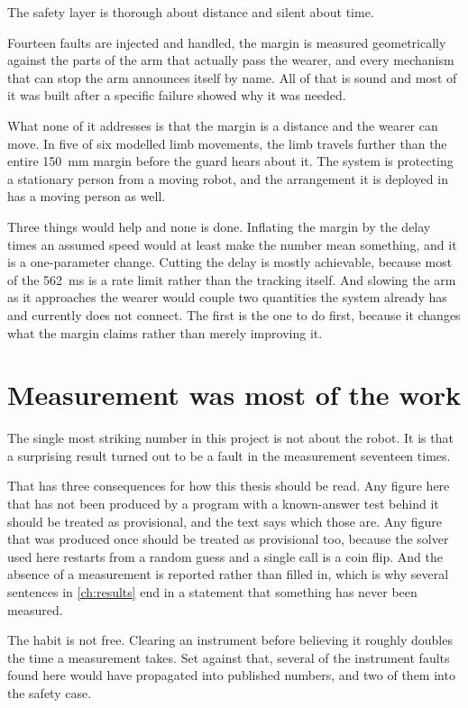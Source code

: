 The safety layer is thorough about distance and silent about time.

Fourteen faults are injected and handled, the margin is measured
geometrically against the parts of the arm that actually pass the wearer, and
every mechanism that can stop the arm announces itself by name. All of that is
sound and most of it was built after a specific failure showed why it was
needed.

What none of it addresses is that the margin is a distance and the wearer can
move. In five of six modelled limb movements, the limb travels further than
the entire \SI{150}{\milli\metre} margin before the guard hears about it. The
system is protecting a stationary person from a moving robot, and the
arrangement it is deployed in has a moving person as well.

Three things would help and none is done. Inflating the margin by the delay
times an assumed speed would at least make the number mean something, and it
is a one-parameter change. Cutting the delay is mostly achievable, because
most of the \SI{562}{\milli\second} is a rate limit rather than the tracking
itself. And slowing the arm as it approaches the wearer would couple two
quantities the system already has and currently does not connect. The first is
the one to do first, because it changes what the margin claims rather than
merely improving it.

\section{Measurement was most of the work}

The single most striking number in this project is not about the robot. It is
that a surprising result turned out to be a fault in the measurement
seventeen times.

That has three consequences for how this thesis should be read. Any figure
here that has not been produced by a program with a known-answer test behind it
should be treated as provisional, and the text says which those are. Any
figure that was produced once should be treated as provisional too, because
the solver used here restarts from a random guess and a single call is a coin
flip. And the absence of a measurement is reported rather than filled in,
which is why several sentences in \cref{ch:results} end in a statement that
something has never been measured.

The habit is not free. Clearing an instrument before believing it roughly
doubles the time a measurement takes. Set against that, several of the
instrument faults found here would have propagated into published numbers, and
two of them into the safety case.


